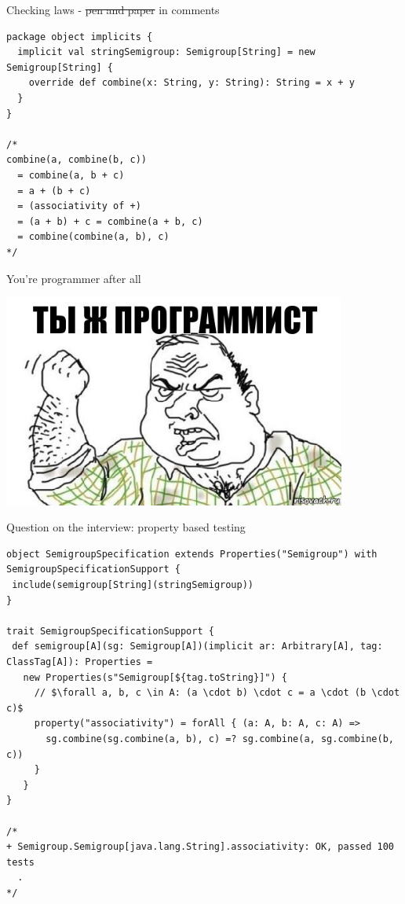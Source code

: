 \documentclass[presentation,aspectratio=169,smaller]{beamer}
\begin{document}
\begin{frame}[label={sec:org149cba3},fragile]{Checking laws - \sout{pen and paper} in comments}
 \begin{verbatim}
package object implicits {
  implicit val stringSemigroup: Semigroup[String] = new Semigroup[String] {
    override def combine(x: String, y: String): String = x + y
  }
}

/*
combine(a, combine(b, c))
  = combine(a, b + c)
  = a + (b + c)
  = (associativity of +)
  = (a + b) + c = combine(a + b, c)
  = combine(combine(a, b), c)
*/
\end{verbatim}
\end{frame}

\begin{frame}[label={sec:orge9a04af}]{You're programmer after all}
\begin{center}
\includegraphics[height=7cm]{images/you-re-programmer.jpg}
\end{center}
\end{frame}

\begin{frame}[label={sec:orgf9bb7f3},fragile]{Question on the interview: property based testing}
 \begin{verbatim}
object SemigroupSpecification extends Properties("Semigroup") with SemigroupSpecificationSupport {
 include(semigroup[String](stringSemigroup))
}

trait SemigroupSpecificationSupport {
 def semigroup[A](sg: Semigroup[A])(implicit ar: Arbitrary[A], tag: ClassTag[A]): Properties =
   new Properties(s"Semigroup[${tag.toString}]") {
     // $\forall a, b, c \in A: (a \cdot b) \cdot c = a \cdot (b \cdot c)$
     property("associativity") = forAll { (a: A, b: A, c: A) =>
       sg.combine(sg.combine(a, b), c) =? sg.combine(a, sg.combine(b, c))
     }
   }
}

/*
+ Semigroup.Semigroup[java.lang.String].associativity: OK, passed 100 tests
  .
*/
\end{verbatim}
\end{frame}
\end{document}
